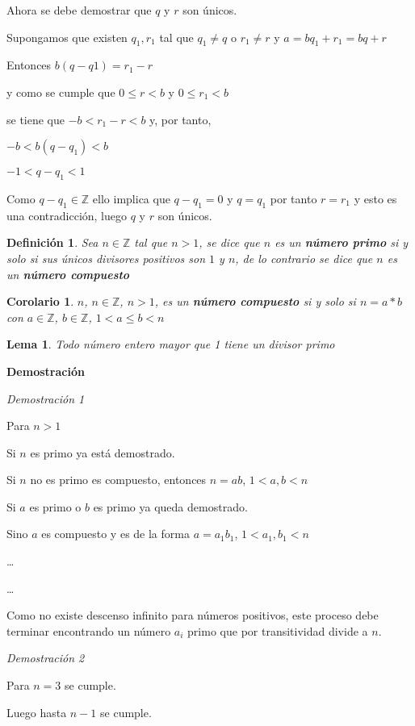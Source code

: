 \documentclass[a4paper,1pt]{report}
\newtheorem*{cor}{Corolario}
\newtheorem*{dfn}{Definición}
\newtheorem*{lem}{Lema}
\begin{document}
Ahora se debe demostrar que $q$ y $r$ son únicos.

Supongamos que existen $q_1,r_1$ tal que $q_1\neq q$ o $r_1\neq r$ y $a=bq_1+r_1=bq+r$

Entonces $b(q-q1)=r_1-r$

y como se cumple que $0\leq r < b$ y $0\leq r_1 < b$

se tiene que $-b<r_1-r<b$ y, por tanto,

$-b<b(q-q_1)<b$

$-1<q-q_1<1$

Como $q-q_1\in\mathbb{Z}$ ello implica que $q-q_1=0$ y $q=q_1$ por tanto $r = r_1$ y esto es una contradicción, luego $q$ y $r$ son únicos.



\begin{dfn}
 Sea $n\in\mathbb{Z}$ tal que $n>1$, se dice que $n$ es un \textbf{número primo} si y solo si sus únicos divisores positivos son $1$ y $n$, de lo contrario se dice que $n$ es un \textbf{número compuesto}
\end{dfn}

\begin{cor}
 $n$, $n\in\mathbb{Z}$, $n>1$, es un \textbf{número compuesto} si y solo si $n=a*b$ con $a\in\mathbb{Z}$, $b\in\mathbb{Z}$, $1<a\leq b < n$
\end{cor}

\begin{lem}
 Todo número entero mayor que 1 tiene un divisor primo
\end{lem}

\textbf{Demostración}

\textit{Demostración 1}

Para $n>1$

Si $n$ es primo ya está demostrado.

Si $n$ no es primo es compuesto, entonces $n=ab$, $1<a,b<n$

Si $a$ es primo o $b$ es primo ya queda demostrado.

Sino $a$ es compuesto y es de la forma $a=a_1b_1$, $1<a_1,b_1<n$

\dots

\dots

Como no existe descenso infinito para números positivos, este proceso debe terminar encontrando un número $a_i$ primo que por transitividad divide a $n$.

\textit{Demostración 2}

Para $n=3$ se cumple.

Luego hasta $n-1$ se cumple. 
\end{document}

